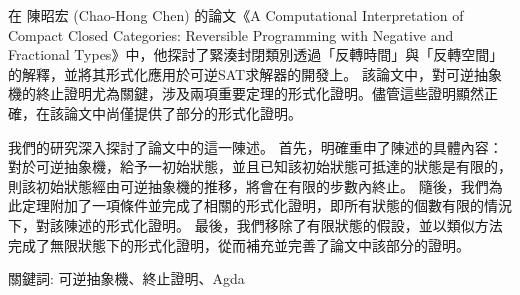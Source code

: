 \begin{abstractzh}
    在 陳昭宏 (Chao-Hong Chen) 的論文《A Computational Interpretation of Compact Closed Categories: Reversible Programming with Negative and Fractional Types》中，他探討了緊湊封閉類別透過「反轉時間」與「反轉空間」的解釋，並將其形式化應用於可逆SAT求解器的開發上。
    該論文中，對可逆抽象機的終止證明尤為關鍵，涉及兩項重要定理的形式化證明。儘管這些證明顯然正確，在該論文中尚僅提供了部分的形式化證明。
    
    我們的研究深入探討了論文中的這一陳述。
    首先，明確重申了陳述的具體內容：對於可逆抽象機，給予一初始狀態，並且已知該初始狀態可抵達的狀態是有限的，則該初始狀態經由可逆抽象機的推移，將會在有限的步數內終止。
    隨後，我們為此定理附加了一項條件並完成了相關的形式化證明，即所有狀態的個數有限的情況下，對該陳述的形式化證明。
    最後，我們移除了有限狀態的假設，並以類似方法完成了無限狀態下的形式化證明，從而補充並完善了論文中該部分的證明。


關鍵詞: 可逆抽象機、終止證明、Agda

\end{abstractzh}